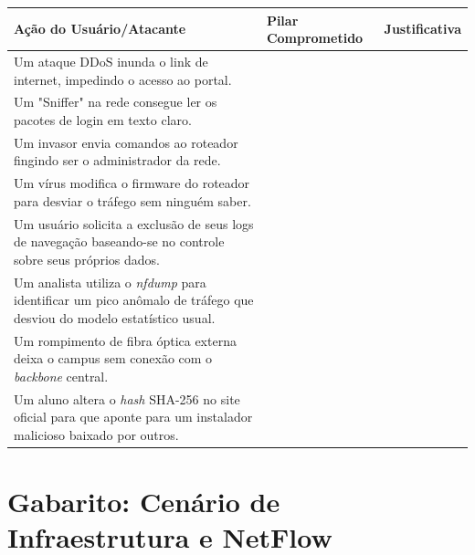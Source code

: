 \begin{table}[h!]
    \centering
    \renewcommand{\arraystretch}{2}
    \begin{tabular}{|p{6cm}|p{3cm}|p{6cm}|}
        \hline
        \textbf{Ação do Usuário/Atacante}                                                                                          & \textbf{Pilar Comprometido} & \textbf{Justificativa} \\ \hline
        Um ataque DDoS inunda o link de internet, impedindo o acesso ao portal.                                                    &                             &                        \\ \hline
        Um "Sniffer" na rede consegue ler os pacotes de login em texto claro.                                                      &                             &                        \\ \hline
        Um invasor envia comandos ao roteador fingindo ser o administrador da rede.                                                &                             &                        \\ \hline
        Um vírus modifica o firmware do roteador para desviar o tráfego sem ninguém saber.                                         &                             &                        \\ \hline
        Um usuário solicita a exclusão de seus logs de navegação baseando-se no controle sobre seus próprios dados.                &                             &                        \\ \hline
        Um analista utiliza o \textit{nfdump} para identificar um pico anômalo de tráfego que desviou do modelo estatístico usual. &                             &                        \\ \hline
        Um rompimento de fibra óptica externa deixa o campus sem conexão com o \textit{backbone} central.                          &                             &                        \\ \hline
        Um aluno altera o \textit{hash} SHA-256 no site oficial para que aponte para um instalador malicioso baixado por outros.   &                             &                        \\ \hline
    \end{tabular}
\end{table}




\section*{Gabarito: Cenário de Infraestrutura e NetFlow}

